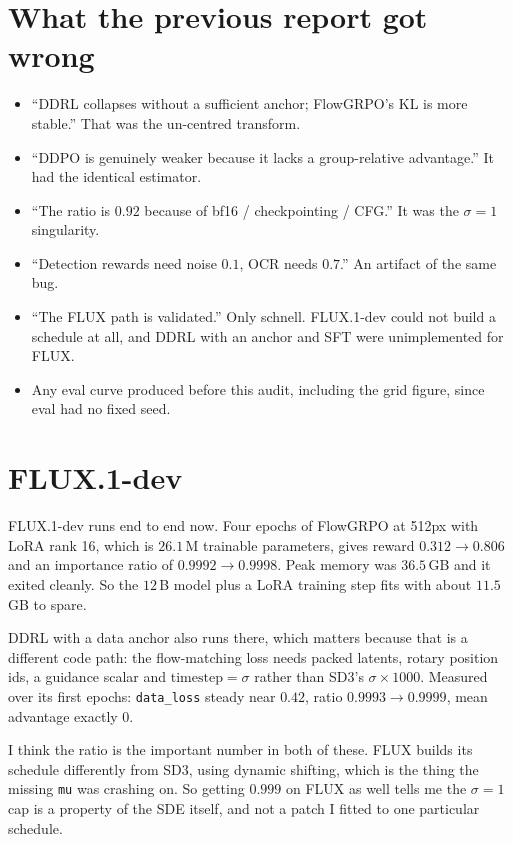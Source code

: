 \documentclass[11pt]{article}
\newcommand{\code}[1]{\texttt{\small #1}}
\begin{document}
\section{What the previous report got wrong}
\label{sec:retract}

\begin{itemize}
\setlength{\itemsep}{1pt}
\item ``DDRL collapses without a sufficient anchor; FlowGRPO's KL is more stable.'' That was the un-centred transform.
\item ``DDPO is genuinely weaker because it lacks a group-relative advantage.'' It had the identical estimator.
\item ``The ratio is $0.92$ because of bf16 / checkpointing / CFG.'' It was the $\sigma=1$ singularity.
\item ``Detection rewards need noise $0.1$, OCR needs $0.7$.'' An artifact of the same bug.
\item ``The FLUX path is validated.'' Only schnell. FLUX.1-dev could not build a schedule at all, and DDRL with an anchor and SFT were unimplemented for FLUX.
\item Any eval curve produced before this audit, including the grid figure, since eval had no fixed seed.
\end{itemize}

\section{FLUX.1-dev}

FLUX.1-dev runs end to end now. Four epochs of FlowGRPO at 512px with LoRA rank 16, which is $26.1$\,M trainable parameters, gives reward $0.312 \to 0.806$ and an importance ratio of $0.9992 \to 0.9998$. Peak memory was $36.5$\,GB and it exited cleanly. So the $12$\,B model plus a LoRA training step fits with about $11.5$\,GB to spare.

DDRL with a data anchor also runs there, which matters because that is a different code path: the flow-matching loss needs packed latents, rotary position ids, a guidance scalar and $\text{timestep}=\sigma$ rather than SD3's $\sigma\times1000$. Measured over its first epochs: \code{data\_loss} steady near $0.42$, ratio $0.9993 \to 0.9999$, mean advantage exactly $0$.

I think the ratio is the important number in both of these. FLUX builds its schedule differently from SD3, using dynamic shifting, which is the thing the missing \code{mu} was crashing on. So getting $0.999$ on FLUX as well tells me the $\sigma=1$ cap is a property of the SDE itself, and not a patch I fitted to one particular schedule.
\end{document}
